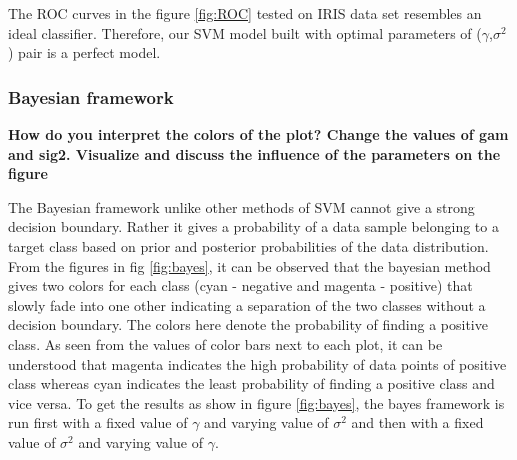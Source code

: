 \documentclass[12pt]{report}
\begin{document}
{The ROC curves in the figure \ref{fig:ROC} tested on IRIS data set resembles an ideal classifier. Therefore, our SVM model built with optimal parameters of ($\gamma$,$\sigma^2$) pair is a perfect model.
\subsubsection{Bayesian framework}
\textbf{How do you interpret the colors of the plot? Change the values of gam and sig2. Visualize and discuss the influence of the parameters on the figure}

The Bayesian framework unlike other methods of SVM cannot give a strong decision boundary. Rather it gives a probability of a data sample belonging to a target class based on prior and posterior probabilities of the data distribution. From the figures in fig \ref{fig:bayes}, it can be observed that the bayesian method gives two colors for each class (cyan - negative and magenta - positive) that slowly fade into one other indicating a separation of the two classes without a decision boundary. The colors here denote the probability of finding a positive class. As seen from the values of color bars next to each plot, it can be understood that magenta indicates the high probability of data points of positive class whereas cyan indicates the least probability of finding a positive class and vice versa. To get the results as show in figure \ref{fig:bayes}, the bayes framework is run first with a fixed value of $\gamma$ and varying value of $\sigma^2$ and then  with a fixed value of $\sigma^2$ and varying value of  $\gamma$.\\

}
\end{document}
